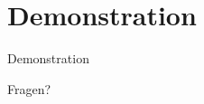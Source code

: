 \section{Demonstration}
	
\begin{frame}
\centering\huge Demonstration
\end{frame}

\begin{frame}
\centering\huge Fragen?
\end{frame}